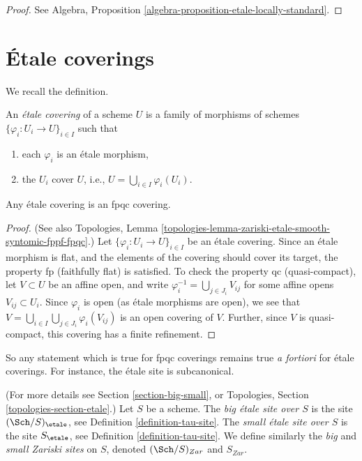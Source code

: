 \begin{proof}
See
Algebra, Proposition \ref{algebra-proposition-etale-locally-standard}.
\end{proof}





\section{\'Etale coverings}
\label{section-etale-covering}

\noindent
We recall the definition.

\begin{definition}
\label{definition-etale-covering}
An {\it \'etale covering} of a scheme $U$ is a family of morphisms
of schemes
$\{\varphi_i : U_i \to U\}_{i \in I}$ such that
\begin{enumerate}
\item each $\varphi_i$ is an \'etale morphism,
\item the $U_i$ cover $U$, i.e., $U = \bigcup_{i\in I}\varphi_i(U_i)$.
\end{enumerate}
\end{definition}

\begin{lemma}
\label{lemma-etale-fpqc}
Any \'etale covering is an fpqc covering.
\end{lemma}

\begin{proof}
(See also
Topologies,
Lemma \ref{topologies-lemma-zariski-etale-smooth-syntomic-fppf-fpqc}.)
Let $\{\varphi_i : U_i \to U\}_{i \in I}$ be an \'etale covering.
Since an \'etale morphism is flat, and the elements of the covering should
cover its target, the property fp (faithfully flat) is satisfied.
To check the property qc (quasi-compact), let $V \subset U$ be an affine
open, and write $\varphi_i^{-1} = \bigcup_{j \in J_i} V_{ij}$
for some affine opens $V_{ij} \subset U_i$. Since $\varphi_i$ is open
(as \'etale morphisms are open), we see that
$V = \bigcup_{i\in I} \bigcup_{j \in J_i} \varphi_i(V_{ij})$
is an open covering of $V$.
Further, since $V$ is quasi-compact, this covering has a finite
refinement.
\end{proof}

\noindent
So any statement which is true for fpqc coverings
remains true {\it a fortiori} for \'etale coverings. For
instance, the \'etale site is subcanonical.

\begin{definition}
\label{definition-big-etale-site}
(For more details see Section \ref{section-big-small}, or
Topologies, Section \ref{topologies-section-etale}.)
Let $S$ be a scheme.
The {\it big \'etale site over $S$} is the site
$(\Sch/S)_\etale$, see
Definition \ref{definition-tau-site}.
The {\it small \'etale site over $S$} is the site $S_\etale$, see
Definition \ref{definition-tau-site}.
We define similarly the {\it big} and {\it small Zariski sites} on $S$,
denoted $(\Sch/S)_{Zar}$ and $S_{Zar}$.
\end{definition}

